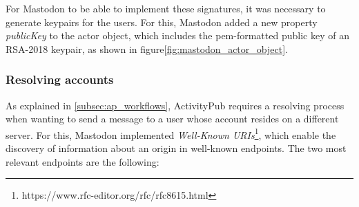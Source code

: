 For Mastodon to be able to implement these signatures, it was necessary to generate keypairs for the users. For this, Mastodon added a new property \emph{publicKey} to the actor object, which includes the pem-formatted public key of an RSA-2018 keypair, as shown in figure\ref{fig:mastodon_actor_object}.


\subsubsection{Resolving accounts}
As explained in \ref{subsec:ap_workflows}, ActivityPub requires a resolving process when wanting to send a message to a user whose account resides on a different server. For this, Mastodon implemented \emph{Well-Known URIs}\footnote{https://www.rfc-editor.org/rfc/rfc8615.html}, which enable the discovery of information about an origin in well-known endpoints\cite{nottingham_2019}. The two most relevant endpoints are the following: 

